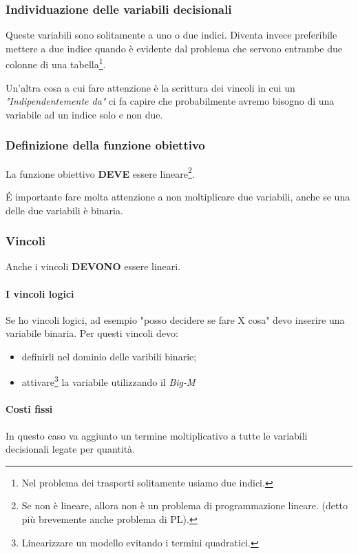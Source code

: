 \subsubsection{Individuazione delle variabili decisionali}
Queste variabili sono solitamente a uno o due indici.
Diventa invece preferibile mettere a due indice quando è evidente dal problema che servono entrambe due colonne di una tabella\footnote{Nel problema dei trasporti solitamente usiamo due indici.}.

Un'altra cosa a cui fare attenzione è la scrittura dei vincoli in cui un \textit{"Indipendentemente da"} ci fa capire che probabilmente avremo bisogno di una variabile ad un indice solo e non due.

\subsubsection{Definizione della funzione obiettivo}
La funzione obiettivo \textbf{DEVE} essere lineare\footnote{Se non è lineare, allora non è un problema di programmazione lineare. (detto più brevemente anche problema di PL).}.

É importante fare molta attenzione a non moltiplicare due variabili, anche se una delle due variabili è binaria.

\subsubsection{Vincoli}

Anche i vincoli \textbf{DEVONO} essere lineari.

\paragraph{I vincoli logici} Se ho vincoli logici, ad esempio "posso decidere se fare X cosa" devo inserire una variabile binaria. Per questi vincoli devo:
\begin{itemize}
    \item definirli nel dominio delle varibili binarie;
    \item attivare\footnote{Linearizzare un modello evitando i termini quadratici.} la variabile utilizzando il \textit{Big-M}
\end{itemize} 

\paragraph{Costi fissi} In questo caso va aggiunto un termine moltiplicativo a tutte le variabili decisionali legate per quantità.

